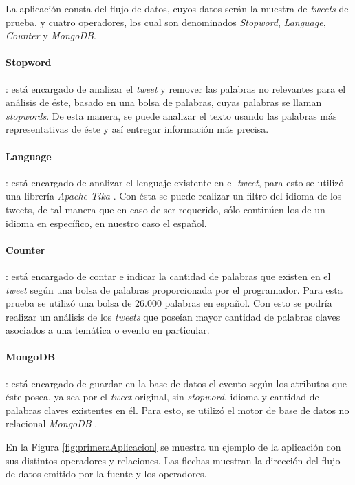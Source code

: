 La aplicación consta del flujo de datos, cuyos datos serán la muestra de \textit{tweets} de prueba, y cuatro operadores, los cual son denominados \textit{Stopword}, \textit{Language}, \textit{Counter} y \textit{MongoDB}.

\paragraph{Stopword}: está encargado de analizar el \textit{tweet} y remover las palabras no relevantes para el análisis de éste, basado en una bolsa de palabras, cuyas palabras se llaman \textit{stopwords}. De esta manera, se puede analizar el texto usando las palabras más representativas de éste y así entregar información más precisa.

\paragraph{Language}: está encargado de analizar el lenguaje existente en el \textit{tweet}, para esto se utilizó una librería \textit{Apache Tika} \citep{mattmann2011tika}. Con ésta se puede realizar un filtro del idioma de los tweets, de tal manera que en caso de ser requerido, sólo continúen los de un idioma en específico, en nuestro caso el español.

\paragraph{Counter}: está encargado de contar e indicar la cantidad de palabras que existen en el \textit{tweet} según una bolsa de palabras proporcionada por el programador. Para esta prueba se utilizó una bolsa de 26.000 palabras en español. Con esto se podría realizar un análisis de los \textit{tweets} que poseían mayor cantidad de palabras claves asociados a una temática o evento en particular.

\paragraph{MongoDB}: está encargado de guardar en la base de datos el evento según los atributos que éste posea, ya sea por el \textit{tweet} original, sin \textit{stopword}, idioma y cantidad de palabras claves existentes en él. Para esto, se utilizó el motor de base de datos no relacional \textit{MongoDB} \citep{chodorow2013mongodb}.

En la Figura \ref{fig:primeraAplicacion} se muestra un ejemplo de la aplicación con sus distintos operadores y relaciones. Las flechas muestran la dirección del flujo de datos emitido por la fuente y los operadores.

